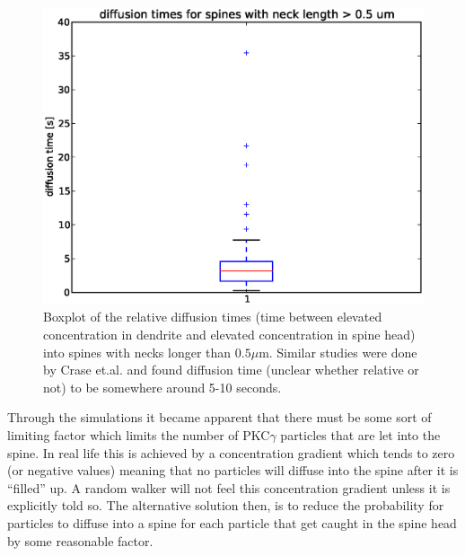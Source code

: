 \documentclass[main.tex]{subfiles}
\begin{document}
\begin{figure}[H]
 \centering
 \includegraphics[scale=0.5]{Figures/spine_stats_boxplot_reltime_longneck.eps}
 \caption[Diffusion time for long necked spines]{Boxplot of the relative diffusion times (time between elevated concentration in dendrite and elevated concentration in spine head) into spines with necks longer than $0.5\mu$m. Similar studies were done by Crase et.al. and found diffusion time (unclear whether relative or not) to be somewhere around 5-10 seconds.}
 \label{results:boxplot_relative_diffusiontime_long_neck}
\end{figure}

Through the simulations it became apparent that there must be some sort of limiting factor which limits the number of PKC$\gamma$ particles that are let into the spine. 
In real life this is achieved by a concentration gradient which tends to zero (or negative values) meaning that no particles will diffuse into the spine after it is ``filled'' up. 
A random walker will not feel this concentration gradient unless it is explicitly told so. 
The alternative solution then, is to reduce the probability for particles to diffuse into a spine for each particle that get caught in the spine head by some reasonable factor. 
\end{document}
